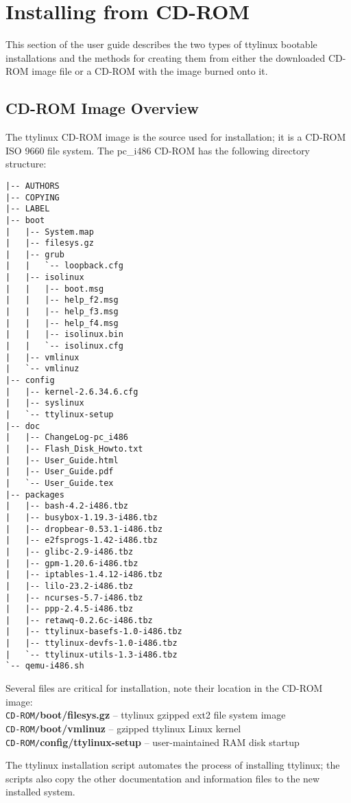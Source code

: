 \documentclass[10pt]{article}
\begin{document}
\newpage
\section{Installing from CD-ROM}
\label{installation}

This section of the user guide describes the two types of ttylinux bootable
installations and the methods for creating them from either the downloaded
CD-ROM image file or a CD-ROM with the image burned onto it.

\subsection{CD-ROM Image Overview}

The ttylinux CD-ROM image is the source used for installation; it is a CD-ROM
ISO 9660 file system. The pc\_i486 CD-ROM has the following directory structure:

\begin{lstlisting}
|-- AUTHORS
|-- COPYING
|-- LABEL
|-- boot
|   |-- System.map
|   |-- filesys.gz
|   |-- grub
|   |   `-- loopback.cfg
|   |-- isolinux
|   |   |-- boot.msg
|   |   |-- help_f2.msg
|   |   |-- help_f3.msg
|   |   |-- help_f4.msg
|   |   |-- isolinux.bin
|   |   `-- isolinux.cfg
|   |-- vmlinux
|   `-- vmlinuz
|-- config
|   |-- kernel-2.6.34.6.cfg
|   |-- syslinux
|   `-- ttylinux-setup
|-- doc
|   |-- ChangeLog-pc_i486
|   |-- Flash_Disk_Howto.txt
|   |-- User_Guide.html
|   |-- User_Guide.pdf
|   `-- User_Guide.tex
|-- packages
|   |-- bash-4.2-i486.tbz
|   |-- busybox-1.19.3-i486.tbz
|   |-- dropbear-0.53.1-i486.tbz
|   |-- e2fsprogs-1.42-i486.tbz
|   |-- glibc-2.9-i486.tbz
|   |-- gpm-1.20.6-i486.tbz
|   |-- iptables-1.4.12-i486.tbz
|   |-- lilo-23.2-i486.tbz
|   |-- ncurses-5.7-i486.tbz
|   |-- ppp-2.4.5-i486.tbz
|   |-- retawq-0.2.6c-i486.tbz
|   |-- ttylinux-basefs-1.0-i486.tbz
|   |-- ttylinux-devfs-1.0-i486.tbz
|   `-- ttylinux-utils-1.3-i486.tbz
`-- qemu-i486.sh
\end{lstlisting}

Several files are critical for installation, note their location in the CD-ROM
image:\\
{\tt CD-ROM/}{\bf boot/filesys.gz} -- ttylinux gzipped ext2 file system image\\
{\tt CD-ROM/}{\bf boot/vmlinuz} -- gzipped ttylinux Linux kernel\\
{\tt CD-ROM/}{\bf config/ttylinux-setup} -- user-maintained RAM disk startup

The ttylinux installation script automates the process of installing ttylinux;
the scripts also copy the other documentation and information files to the new
installed system.
\end{document}
